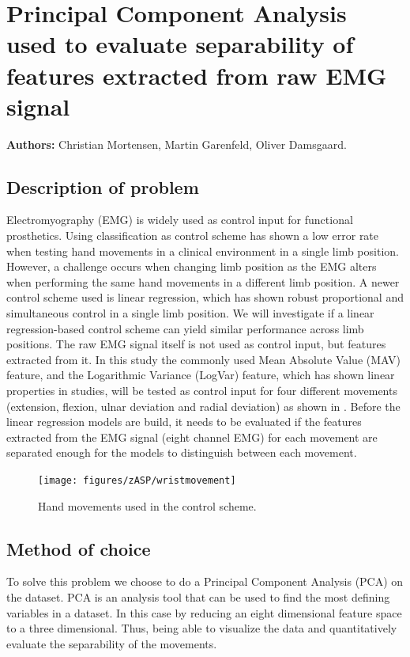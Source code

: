 

\chapter*{Principal Component Analysis used to evaluate separability of features extracted from raw EMG signal}

\textbf{Authors:} Christian Mortensen, Martin Garenfeld, Oliver Damsgaard.

\section*{Description of problem}
Electromyography (EMG) is widely used as control input for functional prosthetics. Using classification as control scheme has shown a low error rate when testing hand movements in a clinical environment in a single limb position. However, a challenge occurs when changing limb position as the EMG alters when performing the same hand movements in a different limb position. A newer control scheme used is linear regression, which has shown robust proportional and simultaneous control in a single limb position. We will investigate if a linear regression-based control scheme can yield similar performance across limb positions. 
The raw EMG signal itself is not used as control input, but features extracted from it. In this study the commonly used Mean Absolute Value (MAV) feature, and the Logarithmic Variance (LogVar) feature, which has shown linear properties in studies, will be tested as control input for four different movements (extension, flexion, ulnar deviation and radial deviation) as shown in . Before the linear regression models are build, it needs to be evaluated if the features extracted from the EMG signal (eight channel EMG) for each movement are separated enough for the models to distinguish between each movement. 

\begin{figure}[H] 
	\texttt{[image: figures/zASP/wristmovement]}
	\caption{Hand movements used in the control scheme.}
	\label{gestures}
\end{figure}

\section*{Method of choice}
To solve this problem we choose to do a Principal Component Analysis (PCA) on the dataset. PCA is an analysis tool that can be used to find the most defining variables in a dataset. In this case by reducing an eight dimensional feature space to a three dimensional. Thus, being able to visualize the data and quantitatively evaluate the separability of the movements.

